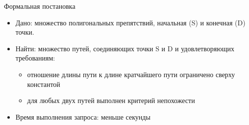 \documentclass[russian, hyperref={unicode}]{beamer}
\theoremstyle{definition}
\begin{document}
\begin{frame}{Формальная постановка}
    \begin{itemize}
        \item Дано: множество полигональных препятствий, начальная (S) и конечная (D) точки.

        \item Найти: множество путей, соединяющих точки S и D и удовлетворяющих требованиям:
        \begin{itemize}
            \item отношение длины пути к длине кратчайшего пути
              ограничено сверху константой
            \item для любых двух путей выполнен критерий непохожести
        \end{itemize}
        
        \item Время выполнения запроса: меньше секунды
    \end{itemize}
\end{frame}
\end{document}
